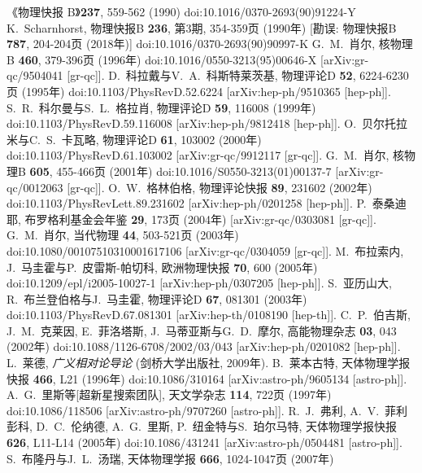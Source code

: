 \documentclass[jkps,preprint,fleqn]{revtex4}
\begin{document}
\begin{CJK*}{UTF8}{gbsn}
\begin{thebibliography}{999}
《物理快报 B》\textbf{237}, 559-562 (1990)
doi:10.1016/0370-2693(90)91224-Y
K.~Scharnhorst,
物理快报B \textbf{236}, 第3期, 354-359页 (1990年)
[勘误: 物理快报B \textbf{787}, 204-204页 (2018年)]
doi:10.1016/0370-2693(90)90997-K
G.~M.~肖尔,
核物理B \textbf{460}, 379-396页 (1996年)
doi:10.1016/0550-3213(95)00646-X
[arXiv:gr-qc/9504041 [gr-qc]].
D.~科拉戴与V.~A.~科斯特莱茨基,
物理评论D \textbf{52}, 6224-6230页 (1995年)
doi:10.1103/PhysRevD.52.6224
[arXiv:hep-ph/9510365 [hep-ph]].
S.~R.~科尔曼与S.~L.~格拉肖,
物理评论D \textbf{59}, 116008 (1999年)
doi:10.1103/PhysRevD.59.116008
[arXiv:hep-ph/9812418 [hep-ph]].
O.~贝尔托拉米与C.~S.~卡瓦略,
物理评论D \textbf{61}, 103002 (2000年)
doi:10.1103/PhysRevD.61.103002
[arXiv:gr-qc/9912117 [gr-qc]].
G.~M.~肖尔,
核物理B \textbf{605}, 455-466页 (2001年)
doi:10.1016/S0550-3213(01)00137-7
[arXiv:gr-qc/0012063 [gr-qc]].
O.~W.~格林伯格,
物理评论快报 \textbf{89}, 231602 (2002年)
doi:10.1103/PhysRevLett.89.231602
[arXiv:hep-ph/0201258 [hep-ph]].
P.~泰桑迪耶,
布罗格利基金会年鉴 \textbf{29}, 173页 (2004年)
[arXiv:gr-qc/0303081 [gr-qc]].
G.~M.~肖尔,
当代物理 \textbf{44}, 503-521页 (2003年)
doi:10.1080/00107510310001617106
[arXiv:gr-qc/0304059 [gr-qc]].
M.~布拉索内, J.~马圭霍与P.~皮雷斯-帕切科,
欧洲物理快报 \textbf{70}, 600 (2005年)
doi:10.1209/epl/i2005-10027-1
[arXiv:hep-ph/0307205 [hep-ph]].
S.~亚历山大, R.~布兰登伯格与J.~马圭霍,
物理评论D \textbf{67}, 081301 (2003年)
doi:10.1103/PhysRevD.67.081301
[arXiv:hep-th/0108190 [hep-th]].
C.~P.~伯吉斯, J.~M.~克莱因, E.~菲洛塔斯, J.~马蒂亚斯与G.~D.~摩尔,
高能物理杂志 \textbf{03}, 043 (2002年)
doi:10.1088/1126-6708/2002/03/043
[arXiv:hep-ph/0201082 [hep-ph]].
 L.~莱德, \textit{广义相对论导论} (剑桥大学出版社, 2009年).
B.~莱本古特,
天体物理学报快报 \textbf{466}, L21 (1996年)
doi:10.1086/310164
[arXiv:astro-ph/9605134 [astro-ph]].
A.~G.~里斯等[超新星搜索团队],
天文学杂志 \textbf{114}, 722页 (1997年)
doi:10.1086/118506
[arXiv:astro-ph/9707260 [astro-ph]].
R.~J.~弗利, A.~V.~菲利彭科, D.~C.~伦纳德, A.~G.~里斯, P.~纽金特与S.~珀尔马特,
天体物理学报快报 \textbf{626}, L11-L14 (2005年)
doi:10.1086/431241
[arXiv:astro-ph/0504481 [astro-ph]].
S.~布隆丹与J.~L.~汤瑞,
天体物理学报 \textbf{666}, 1024-1047页 (2007年)

\end{thebibliography}
\end{CJK*}
\end{document}
